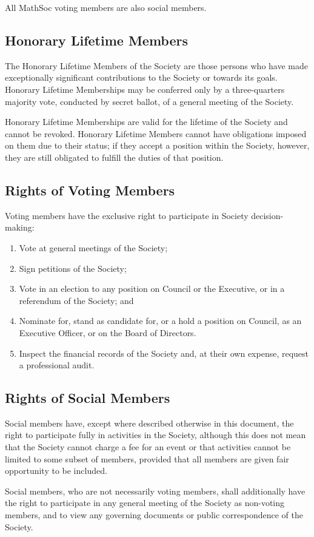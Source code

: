 All MathSoc voting members are also social members. 

\subsection{Honorary Lifetime Members}
The Honorary Lifetime Members of the Society are those persons who have made
exceptionally significant contributions to the Society or towards its goals.
Honorary Lifetime Memberships may be conferred only by a three-quarters majority
vote, conducted by secret ballot, of a general meeting of the Society.

Honorary Lifetime Memberships are valid for the lifetime of the Society and
cannot be revoked. Honorary Lifetime Members cannot have obligations imposed on
them due to their status; if they accept a position within the Society, however,
they are still obligated to fulfill the duties of that position.

\subsection{Rights of Voting Members}
Voting members have the exclusive right to participate in Society
decision-making:
\begin{enumerate}
  \item Vote at general meetings of the Society;
  \item Sign petitions of the Society;
  \item Vote in an election to any position on Council or the
      Executive, or in a referendum of the Society; and
  \item Nominate for, stand as candidate for, or a hold a position on 
      Council, as an Executive Officer, or on the Board of Directors.
  \item Inspect the financial records of the Society and, at their own expense,
    request a professional audit.
\end{enumerate}

\subsection{Rights of Social Members}
Social members have, except where described otherwise in this document, the
right to participate fully in activities in the Society, although this does not
mean that the Society cannot charge a fee for an event or that activities cannot
be limited to some subset of members, provided that all members are given fair
opportunity to be included.

Social members, who are not necessarily voting members, shall additionally have the right to participate in any general meeting
of the Society as non-voting members, and to view any governing documents or
public correspondence of the Society.

